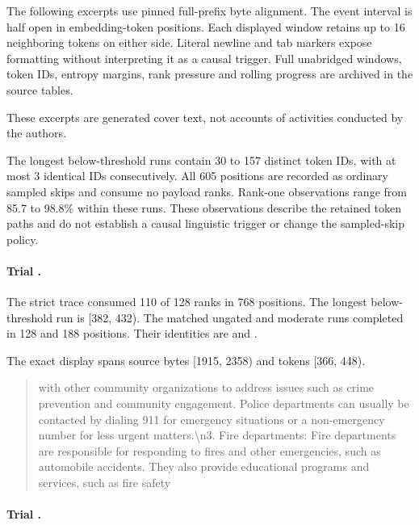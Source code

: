 
The following excerpts use pinned full-prefix byte alignment. The event interval is half open in embedding-token positions. Each displayed window retains up to 16 neighboring tokens on either side. Literal newline and tab markers expose formatting without interpreting it as a causal trigger. Full unabridged windows, token IDs, entropy margins, rank pressure and rolling progress are archived in the source tables.

These excerpts are generated cover text, not accounts of activities conducted by the authors.

The longest below-threshold runs contain 30 to 157 distinct token IDs, with at most 3 identical IDs consecutively. All 605 positions are recorded as ordinary sampled skips and consume no payload ranks. Rank-one observations range from 85.7 to 98.8\% within these runs. These observations describe the retained token paths and do not establish a causal linguistic trigger or change the sampled-skip policy.



\paragraph{Trial .}

The strict trace consumed 110 of 128 ranks in 768 positions. The longest below-threshold run is [382, 432). The matched ungated and moderate runs completed in 128 and 188 positions. Their identities are  and .

The exact display spans source bytes [1915, 2358) and tokens [366, 448).

\begin{quote}\small  with other community organizations to address issues such as crime prevention and community engagement. Police departments can usually be contacted by dialing 911 for emergency situations or a non-emergency number for less urgent matters.\textbackslash{}n3. Fire departments: Fire departments are responsible for responding to fires and other emergencies, such as automobile accidents. They also provide educational programs and services, such as fire safety\end{quote}

\paragraph{Trial .}


